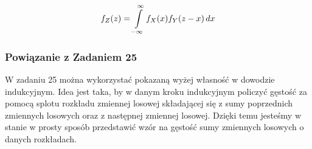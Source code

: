 \documentclass{article}
\begin{document}
    \begin{equation}
        f_Z(z) = \int\displaylimits_{-\infty}^{\infty} f_X(x)f_Y(z-x) \,dx 
    \end{equation}


    \subsubsection{Powiązanie z Zadaniem 25}

    W zadaniu 25 można wykorzystać pokazaną wyżej własność w dowodzie indukcyjnym. Idea jest taka, by w danym kroku indukcyjnym 
    policzyć gęstość za pomocą splotu rozkładu zmiennej losowej składającej się z sumy poprzednich zmiennych losowych oraz z następnej zmiennej losowej.
    Dzięki temu jesteśmy w stanie w prosty sposób przedstawić wzór na gęstość sumy zmiennych losowych o danych rozkładach. 

    
\end{document}
